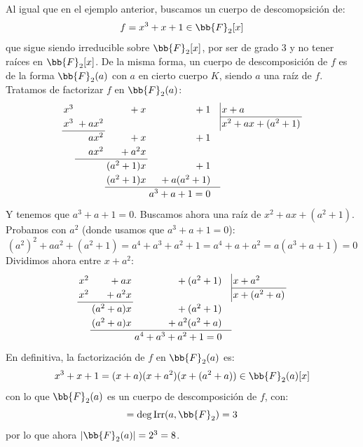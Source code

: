 \begin{ejemplo}
    Al igual que en el ejemplo anterior, buscamos un cuerpo de descomopsición de:
    \begin{equation*}
        f = x^3+x+1 \in \bb{F}_2[x]
    \end{equation*}
    que sigue siendo irreducible sobre $\bb{F}_2[x]$, por ser de grado 3 y no tener raíces en $\bb{F}_2[x]$. De la misma forma, un cuerpo de descomposición de $f$ es de la forma $\bb{F}_2(a)$ con $a$ en cierto cuerpo $K$, siendo $a$ una raíz de $f$. Tratamos de factorizar $f$ en $\bb{F}_2(a)$:
    \[
    \renewcommand{\arraystretch}{1.2}
    \setlength{\arraycolsep}{1.5pt}
    \begin{array}{rrrr@{\quad}l}
    x^3 &         & {}+{} x & {}+{} 1                & \multicolumn{1}{|l}{x + a} \\ \cline{5-5}
    x^3 & {}+{} ax^2 &     &                        & \multicolumn{1}{|l}{x^2 + ax + (a^2 + 1)} \\ \cline{1-2}
        & ax^2    & {}+{} x & {}+{} 1                & \\
        & ax^2    & {}+{} a^2x &                     & \\ \cline{2-3}
        &         & (a^2 + 1)x & {}+{} 1            & \\
        &         & (a^2 + 1)x & {}+{} a(a^2 + 1)   & \\ \cline{3-4}
        &         &            & a^3 + a + 1 = 0    & 
    \end{array}
    \]
    Y tenemos que $a^3+a+1 = 0$. Buscamos ahora una raíz de $x^2+ax+(a^2+1)$. Probamos con $a^2$ (donde usamos que $a^3 + a + 1 = 0$):
    \begin{equation*}
        {\left(a^2\right)}^{2}+ aa^2 + (a^2+1) = a^4 + a^3 + a^2 + 1 = a^4 + a + a^2 = a(a^3 + a + 1) = 0
    \end{equation*}
    Dividimos ahora entre $x+a^2$:
        \[  
    \renewcommand{\arraystretch}{1.2}
    \setlength{\arraycolsep}{1.5pt}
    \begin{array}{rrr@{\quad}l}
    x^2 & {}+{} ax               & {}+{} (a^2 + 1)    & \multicolumn{1}{|l}{x + a^2} \\ \cline{4-4}
    x^2 & {}+{} a^2x             &                    & \multicolumn{1}{|l}{x + (a^2 + a)} \\ \cline{1-2}
        & (a^2 + a)x             & {}+{} (a^2 + 1)    & \\
        & (a^2 + a)x             & {}+{} a^2(a^2 + a) & \\ \cline{2-3}
        &                        & a^4 + a^3 + a^2 + 1 = 0 & 
    \end{array}
    \]
    En definitiva, la factorización de $f$ en $\bb{F}_2(a)$ es:
    \begin{equation*}
        x^3+x+1 = (x+a)(x+a^2)(x+(a^2+a)) \in \bb{F}_2(a)[x]
    \end{equation*}
    con lo que $\bb{F}_2(a)$ es un cuerpo de descomposición de $f$, con:
    \begin{equation*}
        [\bb{F}_2(a):\bb{F}_2] = \deg \Irr(a,\bb{F}_2) = 3
    \end{equation*}
    por lo que ahora $|\bb{F}_2(a)| = 2^3 = 8$.


\end{ejemplo}
